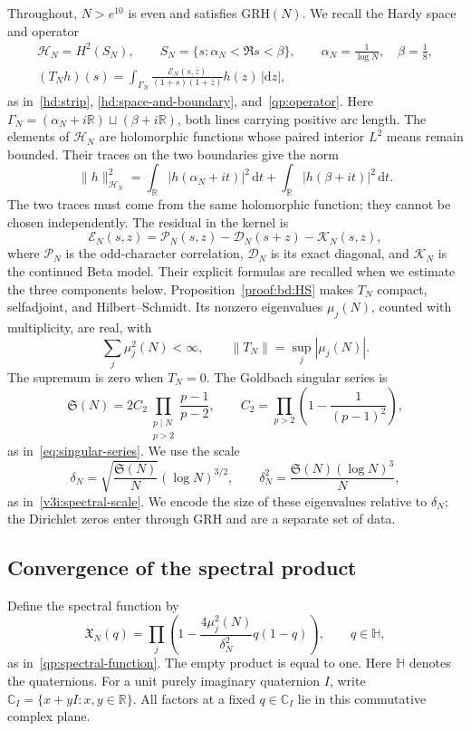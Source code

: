 \documentclass[12pt,a4paper]{amsart}
\numberwithin{equation}{section}
\theoremstyle{plain}
\theoremstyle{definition}
\theoremstyle{remark}
\begin{document}
Throughout, $N>e^{10}$ is even and satisfies $\mathrm{GRH}(N)$.
We recall the Hardy space and operator
\[
 \begin{gathered}
 \mathcal H_N=H^2(S_N),\qquad
 S_N=\{s:\alpha_N<\Re s<\beta\},\qquad
 \alpha_N=\frac1{\log N},\quad\beta=\frac18,\\
 (T_Nh)(s)=\int_{\Gamma_N}
 \frac{\mathscr E_N(s,\bar z)}{(1+s)(1+\bar z)}h(z)\,|\mathrm{d}z|,
 \end{gathered}
\]
as in~\eqref{hd:strip}, \eqref{hd:space-and-boundary}, and~\eqref{qp:operator}.
Here
$\Gamma_N=(\alpha_N+i\mathbb R)\sqcup(\beta+i\mathbb R)$,
both lines carrying positive arc length. The elements of $\mathcal H_N$
are holomorphic functions whose paired interior $L^2$ means remain
bounded. Their traces on the two boundaries give the norm
\[
 \|h\|_{\mathcal H_N}^2
 =\int_{\mathbb R}|h(\alpha_N+it)|^2\,\mathrm{d}t
  +\int_{\mathbb R}|h(\beta+it)|^2\,\mathrm{d}t.
\]
The two traces must come from the same holomorphic function; they
cannot be chosen independently. The residual in the kernel is
\[
 \mathscr E_N(s,z)=\mathscr P_N(s,z)
                    -\mathscr D_N(s+z)-\mathscr K_N(s,z),
\]
where $\mathscr P_N$ is the odd-character correlation,
$\mathscr D_N$ is its exact diagonal, and $\mathscr K_N$ is the
continued Beta model. Their explicit formulas are recalled when we
estimate the three components below.
Proposition~\ref{proof:bd:HS} makes $T_N$
compact, selfadjoint, and Hilbert--Schmidt. Its nonzero eigenvalues
$\mu_j(N)$, counted with multiplicity, are real, with
\[
 \sum_j\mu_j^2(N)<\infty,\qquad
 \|T_N\|=\sup_j|\mu_j(N)|.
\]
The supremum is zero when $T_N=0$. The Goldbach singular series is
\[
 \mathfrak S(N)=2C_2\prod_{\substack{p\mid N\\p>2}}\frac{p-1}{p-2},
 \qquad C_2=\prod_{p>2}\left(1-\frac1{(p-1)^2}\right),
\]
as in~\eqref{eq:singular-series}.
We use the scale
\[
 \delta_N=\sqrt{\frac{\mathfrak S(N)}N}(\log N)^{3/2},
 \qquad \delta_N^2=\frac{\mathfrak S(N)(\log N)^3}{N},
\]
as in~\eqref{v3i:spectral-scale}.
We encode the size of these eigenvalues relative to $\delta_N$;
the Dirichlet zeros enter through GRH and are a separate set of data.

\subsection{Convergence of the spectral product}
\label{proof:v7:spectral-construction}

Define the spectral function by
\[
 \mathfrak X_N(q)=\prod_j
   \left(1-\frac{4\mu_j^2(N)}{\delta_N^2}q(1-q)\right),
 \qquad q\in\mathbb H,
\]
as in~\eqref{qp:spectral-function}.
The empty product is equal to one. Here $\mathbb H$ denotes the
quaternions. For a unit purely imaginary quaternion $I$, write
$\mathbb C_I=\{x+yI:x,y\in\mathbb R\}$. All factors at a fixed
$q\in\mathbb C_I$ lie in this commutative complex plane.
\end{document}
